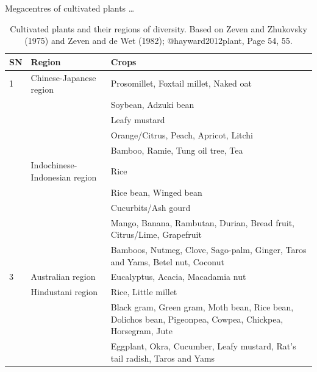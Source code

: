 \documentclass[11pt,ignorenonframetext,aspectratio=169]{beamer}
\begin{document}
\begin{frame}{Megacentres of cultivated plants \ldots{}}
\protect\hypertarget{megacentres-of-cultivated-plants}{}
\begin{table}

\caption{\label{tab:cultivated-megacentres-tab}Cultivated plants and their regions of diversity. Based on Zeven and Zhukovsky (1975) and Zeven and de Wet (1982); @hayward2012plant, Page 54, 55.}
\centering
\fontsize{6}{8}\selectfont
\begin{tabular}[t]{>{\raggedleft\arraybackslash}p{4em}>{\raggedleft\arraybackslash}p{14em}>{\raggedleft\arraybackslash}p{28em}}
\toprule
SN & Region & Crops\\
\midrule
\rowcolor{gray!6}  1 & Chinese-Japanese region & Prosomillet, Foxtail millet, Naked oat\\
 &  & Soybean, Adzuki bean\\
\rowcolor{gray!6}   &  & Leafy mustard\\
 &  & Orange/Citrus, Peach, Apricot, Litchi\\
\rowcolor{gray!6}   &  & Bamboo, Ramie, Tung oil tree, Tea\\
\addlinespace
2 & Indochinese-Indonesian region & Rice\\
\rowcolor{gray!6}   &  & Rice bean, Winged bean\\
 &  & Cucurbits/Ash gourd\\
\rowcolor{gray!6}   &  & Mango, Banana, Rambutan, Durian, Bread fruit, Citrus/Lime, Grapefruit\\
 &  & Bamboos, Nutmeg, Clove, Sago-palm, Ginger, Taros and Yams, Betel nut, Coconut\\
\addlinespace
\rowcolor{gray!6}  3 & Australian region & Eucalyptus, Acacia, Macadamia nut\\
4 & Hindustani region & Rice, Little millet\\
\rowcolor{gray!6}   &  & Black gram, Green gram, Moth bean, Rice bean, Dolichos bean, Pigeonpea, Cowpea, Chickpea, Horsegram, Jute\\
 &  & Eggplant, Okra, Cucumber, Leafy mustard, Rat's tail radish, Taros and Yams\\
\bottomrule
\end{tabular}
\end{table}
\end{frame}
\end{document}
